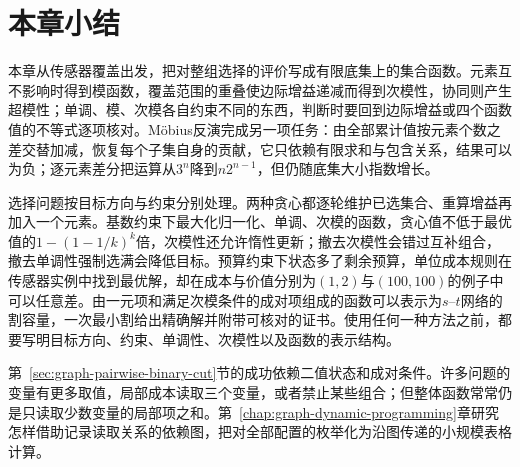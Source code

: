 
\section{本章小结}
\label{sec:graph-set-functions-summary}

本章从传感器覆盖出发，把对整组选择的评价写成有限底集上的集合函数。元素互不影响时得到模函数，覆盖范围的重叠使边际增益递减而得到次模性，协同则产生超模性；单调、模、次模各自约束不同的东西，判断时要回到边际增益或四个函数值的不等式逐项核对。Möbius反演完成另一项任务：由全部累计值按元素个数之差交替加减，恢复每个子集自身的贡献，它只依赖有限求和与包含关系，结果可以为负；逐元素差分把运算从$3^n$降到$n2^{n-1}$，但仍随底集大小指数增长。

选择问题按目标方向与约束分别处理。两种贪心都逐轮维护已选集合、重算增益再加入一个元素。基数约束下最大化归一化、单调、次模的函数，贪心值不低于最优值的$1-(1-1/k)^k$倍，次模性还允许惰性更新；撤去次模性会错过互补组合，撤去单调性强制选满会降低目标。预算约束下状态多了剩余预算，单位成本规则在传感器实例中找到最优解，却在成本与价值分别为$(1,2)$与$(100,100)$的例子中可以任意差。由一元项和满足次模条件的成对项组成的函数可以表示为$s$--$t$网络的割容量，一次最小割给出精确解并附带可核对的证书。使用任何一种方法之前，都要写明目标方向、约束、单调性、次模性以及函数的表示结构。

第~\ref{sec:graph-pairwise-binary-cut}节的成功依赖二值状态和成对条件。许多问题的变量有更多取值，局部成本读取三个变量，或者禁止某些组合；但整体函数常常仍是只读取少数变量的局部项之和。第~\ref{chap:graph-dynamic-programming}章研究怎样借助记录读取关系的依赖图，把对全部配置的枚举化为沿图传递的小规模表格计算。
